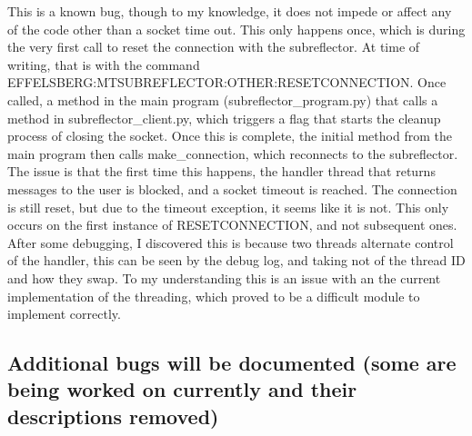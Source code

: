 \documentclass{article}
\begin{document}
This is a known bug, though to my knowledge, it does not impede or affect any of the code other than a socket time out. This only happens once, which is during the very first call to reset the connection with the subreflector. At time of writing, that is with the command EFFELSBERG:MTSUBREFLECTOR:OTHER:RESETCONNECTION. Once called, a method in the main program (subreflector\_program.py) that 
calls a method in subreflector\_client.py, which triggers a flag that starts the cleanup process of closing the socket. Once this is complete, the initial method from the main program then calls make\_connection, which reconnects to the subreflector. The issue is that the first time this happens, the handler thread that returns messages to the user is blocked, and a socket timeout is reached. The connection is still reset, but due to the timeout exception, it seems like it is not. This only occurs on the first instance of RESETCONNECTION, and not subsequent ones. After some debugging, I discovered this is because two threads alternate control of the handler, this can be seen by the debug log, and taking not of the thread ID and how they swap. To my understanding this is an issue with an the current implementation of the threading, which proved to be a difficult module to implement correctly.

\subsection{Additional bugs will be documented (some are being worked on currently and their descriptions removed)}

\end{document}
